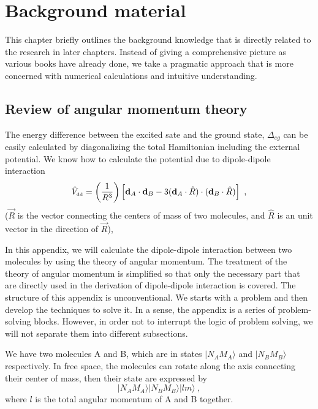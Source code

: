 
\chapter{Background material}
\label{ch:background}
This chapter  briefly outlines the background knowledge that is directly related to the research in later chapters.
Instead of giving a comprehensive picture as various books have already done, we take a pragmatic approach that 
is more concerned with numerical calculations and intuitive understanding.  

\section{Review of angular momentum theory}
\label{sec:angularMomentum}

The energy difference between the excited sate and the ground state, $\Delta_{eg}$ can be easily calculated by diagonalizing  the total Hamiltonian including the external potential. We know how to calculate the potential due to dipole-dipole interaction 
\begin{equation}
\hat{V}_{\mbox{\tiny dd}} = \left(\frac{1}{R^3}\right)\left[ \mathbf{d}_{A}\cdot\mathbf{d}_{B}-3(\mathbf{d}_{A}\cdot\hat{R})\cdot(\mathbf{d}_{B}\cdot\hat{R})\right] \ , \nonumber
\end{equation}
($\vec{R}$ is the vector connecting the centers of mass of two molecules, and $\hat{R}$ is an unit vector in the direction of $\vec{R}$), 


In this appendix, we will calculate the dipole-dipole interaction between two molecules by using the theory of angular momentum. The treatment of the theory of angular momentum is simplified so that only the necessary part that are directly used in the derivation of dipole-dipole interaction is covered. The structure of this appendix is  unconventional. We starts with a problem and then develop the techniques to solve it. In a sense, the appendix is a series of problem-solving blocks. However, in order not to interrupt the logic of problem solving, we will not separate them into different subsections. 

We have two molecules A and B, which are in states $|N_{A}M_{A}\rangle$ and $|N_{B}M_{B}\rangle$ respectively. In free space, the molecules can rotate along the axis connecting their center of mass, then their state are expressed by
\begin{equation}
|N_{A}M_{A}\rangle |N_{B}M_{B}\rangle |lm\rangle  \ , \nonumber
\end{equation}
where $l$ is the total angular momentum of A and B together. 

